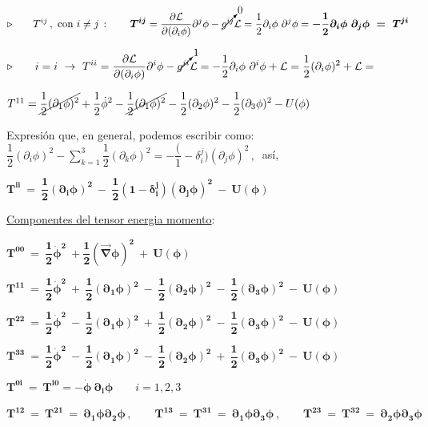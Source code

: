 \vspace{3mm} $\triangleright \qquad \displaystyle T^{ij}\, , \ \text{con } i \neq j\, : \qquad \boldsymbol{ T^{ij}} =
\pdv{\mathcal L}{(\partial_i \phi)} \partial^j \phi - \cancelto{0}{g^{ij}} \mathcal L =\dfrac 1 2 \partial_i \phi \ \partial^j \phi =
\boldsymbol{ - \dfrac 1 2 \partial_i \phi \ \partial_j \phi \ = \ T^{ji}}$

\vspace{3mm} $\triangleright \qquad i=i \ \to \ \displaystyle T^{ii} =
\pdv{\mathcal L}{(\partial_i \phi)} \partial^i \phi - \cancelto{1}{g^{ii}} \mathcal L = - \dfrac 1 2 \partial_i \phi \ \partial^i \phi + \mathcal L = \dfrac 1 2 (\partial_i \phi)^2 + \mathcal L =$

$T^{11} =  \displaystyle  \cancel{\dfrac 1 2 (\partial_1 \phi)^2} + \dfrac 1 2 \dot \phi^2- \cancel{ \dfrac 1 2 (\partial_1 \phi)^2}-\dfrac 1 2 (\partial_2 \phi)^2-\dfrac 1 2 (\partial_3 \phi)^2 - U(\phi) $

Expresión que, en general, podemos escribir como: $\displaystyle \dfrac 1 2 (\partial_i \phi)^2 - \sum_{k=1}^3 \dfrac 1 2 (\partial_k \phi)^2 = -\dfrac (1-\delta^j_i) (\partial_j \phi)^2\, , \ $ así,

$\boldsymbol{T^{ii} \ = \ \dfrac 1 2 (\partial_i \phi)^2 \ - \ \dfrac 1 2 (1-\delta^j_i) (\partial_j \phi)^2 \ - \ U(\phi)}$

\vspace{5mm}

\underline{Componentes del tensor energia momento}:

\begin{adjustwidth}{20pt}{20pt}

\color{NavyBlue}

$ \boldsymbol{ T^{00} \ = \ \dfrac 1 2 \dot \phi^2 \ + \dfrac 1 2 (\overrightarrow \nabla \phi)^2 \ + \   U(\phi) }$ 

$ \boldsymbol{T^{11} \ = \ \dfrac 1 2 \dot \phi^2 \ + \ \dfrac 1 2 (\partial_1 \phi)^2 \ - \ \dfrac 1 2 (\partial_2 \phi)^2 \ - \ \dfrac 1 2 (\partial_3 \phi)^2  \ - \ U(\phi)}$

$ \boldsymbol{T^{22} \ = \ \dfrac 1 2 \dot \phi^2 \ - \ \dfrac 1 2 (\partial_1 \phi)^2 \ + \ \dfrac 1 2 (\partial_2 \phi)^2 \ - \ \dfrac 1 2 (\partial_3 \phi)^2  \ - \ U(\phi)}$

$ \boldsymbol{T^{33} \ = \ \dfrac 1 2 \dot \phi^2 \ - \ \dfrac 1 2 (\partial_1 \phi)^2 \ - \ \dfrac 1 2 (\partial_2 \phi)^2 \ + \ \dfrac 1 2 (\partial_3 \phi)^2  \ - \ U(\phi)}$

$ \boldsymbol{T^{0i} \ = \ T^{i0} = - \dot \phi \ \partial_i \phi } \qquad i=1,2,3$

$ \boldsymbol{T^{12}\ = \ T^{21} \ = \ \partial_1 \phi \partial_2 \phi}\, ,  \qquad
\boldsymbol{T^{13}\ = \ T^{31} \ = \ \partial_1 \phi \partial_3 \phi}\, ,  \qquad \boldsymbol{T^{23}\ = \ T^{32} \ = \ \partial_2 \phi \partial_3 \phi}$
\end{adjustwidth}

